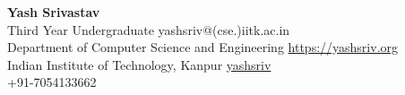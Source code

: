 \documentclass[10pt]{article}
\begin{document}
 {
\noindent
{\Huge\textbf{Yash Srivastav}} \\

\noindent
Third Year Undergraduate \hfill yashsriv@(cse.)iitk.ac.in \faEnvelope\\
Department of Computer Science and Engineering \hfill
\href{https://yashsriv.org}{https://yashsriv.org \faHome}\\
Indian Institute of Technology, Kanpur \hfill
\href{https://github.com/yashsriv}{yashsriv \faGithub}\\
\hfill +91-7054133662 \faMobile


}






\end{document}
